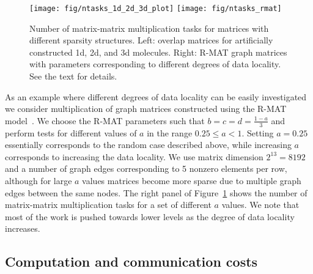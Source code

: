 \documentclass{elsarticle}
\begin{document}
\begin{figure}
  \begin{center}
    \texttt{[image: fig/ntasks\_1d\_2d\_3d\_plot]}
    \texttt{[image: fig/ntasks\_rmat]}
  \end{center}
  \caption{Number of matrix-matrix multiplication tasks for matrices
    with different sparsity structures. Left: overlap matrices for
    artificially constructed 1d, 2d, and 3d molecules. Right: R-MAT
    graph matrices with parameters corresponding to different degrees
    of data locality. See the text for
    details. \label{fig:ntasks_1d_2d_3d_and_rmat}}
\end{figure}

As an example where different degrees of data locality can be easily
investigated we consider multiplication of graph matrices constructed
using the R-MAT model~\cite{R-MAT}. We choose the R-MAT parameters
such that $b=c=d=\frac{1-a}{3}$ and perform tests for different values
of $a$ in the range $0.25 \leq a < 1$. Setting $a = 0.25$ essentially
corresponds to the random case described above, while increasing $a$
corresponds to increasing the data locality.  We use matrix dimension
$2^{13}=8192$ and a number of graph edges corresponding to 5 nonzero
elements per row, although for large $a$ values matrices become more
sparse due to multiple graph edges between the same nodes. The right
panel of Figure~\ref{fig:ntasks_1d_2d_3d_and_rmat} shows the number of
matrix-matrix multiplication tasks for a set of different $a$ values.
We note that most of the work is pushed towards lower levels as the
degree of data locality increases.


\subsection{Computation and communication costs} \label{subsec:CompAndCommCosts}
\end{document}

